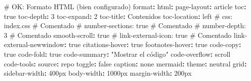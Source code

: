 \documentclass[
  doc,
  floatsintext,
  longtable,
  a4paper,
  nolmodern,
  notxfonts,
  notimes,
  12pt,
  colorlinks=true,linkcolor=blue,citecolor=blue,urlcolor=blue]{apa7}
\newenvironment{Shaded}{\begin{snugshade}}{\end{snugshade}}
\newcommand{\AttributeTok}[1]{\textcolor[rgb]{0.40,0.45,0.13}{#1}}
\newcommand{\CharTok}[1]{\textcolor[rgb]{0.13,0.47,0.30}{#1}}
\newcommand{\CommentTok}[1]{\textcolor[rgb]{0.37,0.37,0.37}{#1}}
\newcommand{\DecValTok}[1]{\textcolor[rgb]{0.68,0.00,0.00}{#1}}
\newcommand{\FunctionTok}[1]{\textcolor[rgb]{0.28,0.35,0.67}{#1}}
\newcommand{\KeywordTok}[1]{\textcolor[rgb]{0.00,0.23,0.31}{\textbf{#1}}}
\newcommand{\StringTok}[1]{\textcolor[rgb]{0.13,0.47,0.30}{#1}}
\newcounter{none} %
\begin{document}
\begin{Shaded}
\begin{Highlighting}[]
\CommentTok{\# OK: Formato HTML (bien configurado)}
\FunctionTok{format}\KeywordTok{:}
\AttributeTok{  }\FunctionTok{html}\KeywordTok{:}
\AttributeTok{    }\FunctionTok{page{-}layout}\KeywordTok{:}\AttributeTok{ article  }
\AttributeTok{    }\FunctionTok{toc}\KeywordTok{:}\AttributeTok{ }\CharTok{true}\AttributeTok{  }
\AttributeTok{    }\FunctionTok{toc{-}depth}\KeywordTok{:}\AttributeTok{ }\DecValTok{3}\AttributeTok{  }
\AttributeTok{    }\FunctionTok{toc{-}expand}\KeywordTok{:}\AttributeTok{ }\DecValTok{2}\AttributeTok{  }
\AttributeTok{    }\FunctionTok{toc{-}title}\KeywordTok{:}\AttributeTok{ Contenidos  }
\AttributeTok{    }\FunctionTok{toc{-}location}\KeywordTok{:}\AttributeTok{ left  }
\CommentTok{    \# css: index.css       \#  Comentado}
\CommentTok{    \# number{-}sections: true \#  Comentado}
\CommentTok{    \# number{-}depth: 3      \#  Comentado}
\AttributeTok{    }\FunctionTok{smooth{-}scroll}\KeywordTok{:}\AttributeTok{ }\CharTok{true}\AttributeTok{  }
\CommentTok{    \# link{-}external{-}icon: true  \#  Comentado}
\AttributeTok{    }\FunctionTok{link{-}external{-}newwindow}\KeywordTok{:}\AttributeTok{ }\CharTok{true}\AttributeTok{  }
\AttributeTok{    }\FunctionTok{citations{-}hover}\KeywordTok{:}\AttributeTok{ }\CharTok{true}\AttributeTok{  }
\AttributeTok{    }\FunctionTok{footnotes{-}hover}\KeywordTok{:}\AttributeTok{ }\CharTok{true}\AttributeTok{  }
\AttributeTok{    }\FunctionTok{code{-}copy}\KeywordTok{:}\AttributeTok{ }\CharTok{true}\AttributeTok{  }
\AttributeTok{    }\FunctionTok{code{-}fold}\KeywordTok{:}\AttributeTok{ }\CharTok{true}\AttributeTok{  }
\AttributeTok{    }\FunctionTok{code{-}summary}\KeywordTok{:}\AttributeTok{ }\StringTok{"Mostrar el código"}\AttributeTok{  }
\AttributeTok{    }\FunctionTok{code{-}overflow}\KeywordTok{:}\AttributeTok{ scroll  }
\AttributeTok{    }\FunctionTok{code{-}tools}\KeywordTok{:}
\AttributeTok{      }\FunctionTok{source}\KeywordTok{:}\AttributeTok{ repo  }
\AttributeTok{      }\FunctionTok{toggle}\KeywordTok{:}\AttributeTok{ }\CharTok{false}\AttributeTok{  }
\AttributeTok{      }\FunctionTok{caption}\KeywordTok{:}\AttributeTok{ none  }
\AttributeTok{    }\FunctionTok{mermaid}\KeywordTok{:}\AttributeTok{ }
\AttributeTok{      }\FunctionTok{theme}\KeywordTok{:}\AttributeTok{ neutral}
\AttributeTok{    }\FunctionTok{grid}\KeywordTok{:}\AttributeTok{ }
\AttributeTok{      }\FunctionTok{sidebar{-}width}\KeywordTok{:}\AttributeTok{ 400px }
\AttributeTok{      }\FunctionTok{body{-}width}\KeywordTok{:}\AttributeTok{ 1000px }
\AttributeTok{      }\FunctionTok{margin{-}width}\KeywordTok{:}\AttributeTok{ 200px }

\end{Highlighting}
\end{Shaded}
\end{document}
